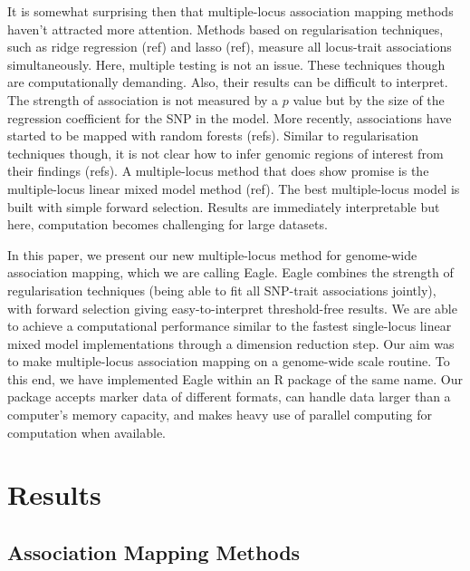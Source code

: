 \documentclass{article}
\begin{document}
It is somewhat surprising then that multiple-locus association mapping methods haven't attracted more attention. Methods based on 
regularisation techniques, such as ridge regression (ref) and lasso (ref), measure all locus-trait associations simultaneously. 
Here, multiple testing is not an issue. These techniques though are computationally demanding. Also, their results can be difficult to interpret. The strength of association is not measured by a $p$ value but by the size of the regression coefficient for the SNP in the model. More recently, associations have started to be mapped with random forests (refs). Similar to regularisation techniques though, it is not clear how to infer genomic regions of interest from their findings (refs). A multiple-locus method that does show promise is the multiple-locus linear mixed model method (ref). The best multiple-locus model is built with simple forward selection. Results are immediately interpretable but here, computation becomes challenging for large datasets. 

In this paper, we present our new multiple-locus method for genome-wide association mapping, which we are calling Eagle. 
Eagle combines the strength of regularisation techniques (being able to fit all SNP-trait associations jointly), with forward selection giving easy-to-interpret threshold-free results.   We are able to achieve a computational performance similar to the fastest single-locus linear mixed model implementations 
through a dimension reduction step.
Our aim was to make multiple-locus association mapping on a genome-wide scale routine. To this end, we have implemented Eagle 
within an R package of the same name. 
Our package accepts marker data of different 
formats,  can handle data larger than a computer's  memory capacity, and makes heavy use of 
parallel computing for computation when available.  


\section{Results}

\subsection{Association Mapping Methods}
\end{document}

